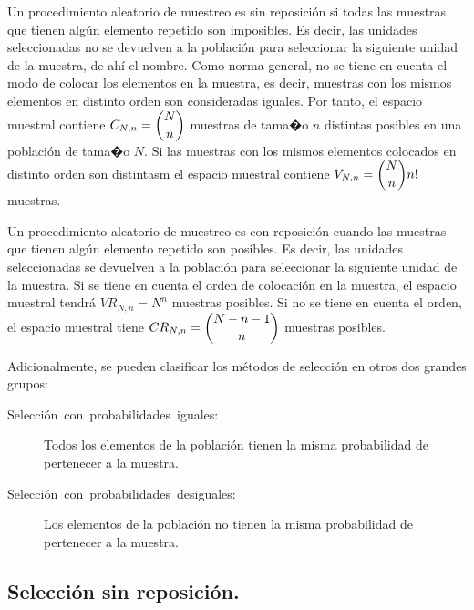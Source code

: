 Un procedimiento aleatorio de muestreo es sin reposici\'on si todas
las muestras que tienen alg\'un elemento repetido son imposibles. Es
decir, las unidades seleccionadas no se devuelven a la poblaci\'on para
seleccionar la siguiente unidad de la muestra, de ah\'i el nombre. Como
norma general, no se tiene en cuenta el modo de colocar los elementos
en la muestra, es decir, muestras con los mismos elementos en distinto
orden son consideradas iguales. Por tanto, el espacio muestral contiene
$C_{N,n}=\dbinom{N}{n}$ muestras de tama�o $n$ distintas posibles
en una poblaci\'on de tama�o $N$. Si las muestras con los mismos elementos
colocados en distinto orden son distintasm el espacio muestral contiene
$V_{N.n}=\dbinom{N}{n}n!$ muestras.

Un procedimiento aleatorio de muestreo es con reposici\'on cuando las
muestras que tienen alg\'un elemento repetido son posibles. Es decir,
las unidades seleccionadas se devuelven a la poblaci\'on para seleccionar
la siguiente unidad de la muestra. Si se tiene en cuenta el orden
de colocaci\'on en la muestra, el espacio muestral tendr\'a $VR_{N,n}=N^{n}$
muestras posibles. Si no se tiene en cuenta el orden, el espacio muestral
tiene $CR_{N,n}=\dbinom{N-n-1}{n}$ muestras posibles.

Adicionalmente, se pueden clasificar los m\'etodos de selecci\'on en otros
dos grandes grupos:
\begin{description}
\item [{Selecci\'on~con~probabilidades~iguales:}] Todos los elementos
de la poblaci\'on tienen la misma probabilidad de pertenecer a la muestra.
\item [{Selecci\'on~con~probabilidades~desiguales:}] Los elementos de
la poblaci\'on no tienen la misma probabilidad de pertenecer a la muestra.
\end{description}

\subsection{Selecci\'on sin reposici\'on.}

